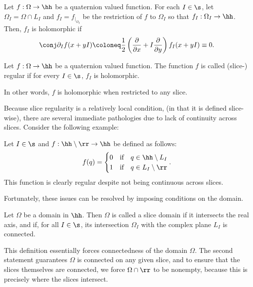 \documentclass{amsart}
\begin{document}
\begin{defin}
    Let $f:\Omega\to\hh$ be a quaternion valued function. For each $I\in\s$, let $\Omega_I=\Omega\cap L_I$ and $f_I=f_{\mid_{\Omega_I}}$ be the restriction of $f$ to $\Omega_I$ so that $f_I:\Omega_I \to \hh$. Then, $f_I$ is holomorphic if \[\conj \partial _I f(x+yI)\coloneq \frac12 \left(\frac{\partial }{\partial x}+I\frac{\partial }{\partial y}\right)f_I(x+yI)\equiv 0.\]
\end{defin}

\begin{defin}
    Let $f:\Omega\to\hh$ be a quaternion valued function. The function $f$ is called (slice-) regular if for every $I\in\s$, $f_I$ is holomorphic. 
\end{defin}
In other words, $f$ is holomorphic when restricted to any slice.

Because slice regularity is a relatively local condition, (in that it is defined slice-wise), there are several immediate pathologies due to lack of continuity across slices. Consider the following example:

\begin{example}
    Let $I\in\s$ and $f:\hh\setminus\rr\to\hh$ be defined as follows: 
    \[f(q)=\begin{cases}
        0 &\text{if} \quad q\in\hh\setminus L_I \\
        1 &\text{if} \quad q\in L_I \setminus \rr
    \end{cases}.\]
    This function is clearly regular despite not being continuous across slices.  
\end{example}

Fortunately, these issues can be resolved by imposing conditions on the domain. 

\begin{defin}
    Let $\Omega$ be a domain in $\hh$. Then $\Omega$ is called a slice domain if it intersects the real axis, and if, for all $I\in\s$, its intersection $\Omega_I$ with the complex plane $L_I$ is connected. 
\end{defin}

This definition essentially forces connectedness of the domain $\Omega$. The second statement guarantees $\Omega$ is connected on any given slice, and to ensure that the slices themselves are connected, we force $\Omega \cap \rr$ to be nonempty, because this is precisely where the slices intersect. 
\end{document}
